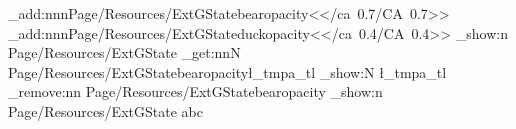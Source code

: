 \documentclass{article}
\begin{document}

\ExplSyntaxOn
\pdfmanagement_add:nnn{Page/Resources/ExtGState}{bearopacity}{<</ca~0.7/CA~0.7>>}
\pdfmanagement_add:nnn{Page/Resources/ExtGState}{duckopacity}{<</ca~0.4/CA~0.4>>}
\pdfmanagement_show:n    {Page/Resources/ExtGState}
\pdfmanagement_get:nnN   {Page/Resources/ExtGState}{bearopacity}\l_tmpa_tl
\tl_show:N \l_tmpa_tl
\pdfmanagement_remove:nn {Page/Resources/ExtGState}{bearopacity}
\pdfmanagement_show:n    {Page/Resources/ExtGState}
\ExplSyntaxOff
abc
\end{document}
